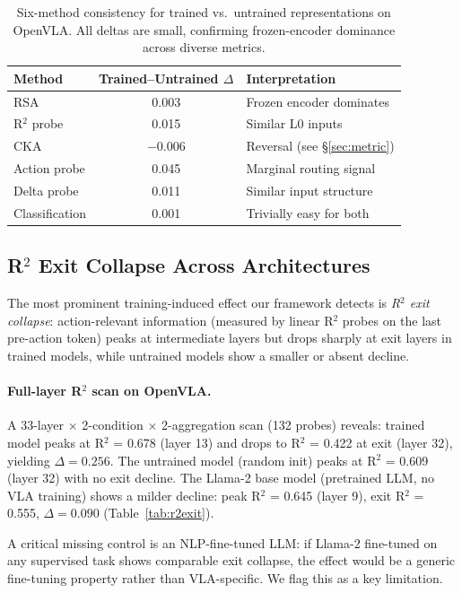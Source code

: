 \documentclass[letterpaper]{article}
\begin{document}
\begin{table}[t]
\centering
\caption{Six-method consistency for trained vs.\ untrained representations on OpenVLA. All deltas are small, confirming frozen-encoder dominance across diverse metrics.}
\label{tab:sixmethod}
\small
\begin{tabular}{lcl}
\toprule
\textbf{Method} & \textbf{Trained--Untrained $\Delta$} & \textbf{Interpretation} \\
\midrule
RSA & 0.003 & Frozen encoder dominates \\
R$^2$ probe & 0.015 & Similar L0 inputs \\
CKA & $-0.006$ & Reversal (see \S\ref{sec:metric}) \\
Action probe & 0.045 & Marginal routing signal \\
Delta probe & 0.011 & Similar input structure \\
Classification & 0.001 & Trivially easy for both \\
\bottomrule
\end{tabular}
\end{table}

\subsection{R$^2$ Exit Collapse Across Architectures}
\label{sec:exit}

The most prominent training-induced effect our framework detects is \emph{R$^2$ exit collapse}: action-relevant information (measured by linear R$^2$ probes on the last pre-action token) peaks at intermediate layers but drops sharply at exit layers in trained models, while untrained models show a smaller or absent decline.

\paragraph{Full-layer R$^2$ scan on OpenVLA.}
A 33-layer $\times$ 2-condition $\times$ 2-aggregation scan (132 probes) reveals: trained model peaks at R$^2$ = 0.678 (layer 13) and drops to R$^2$ = 0.422 at exit (layer 32), yielding $\Delta = 0.256$.
The untrained model (random init) peaks at R$^2$ = 0.609 (layer 32) with no exit decline.
The Llama-2 base model (pretrained LLM, no VLA training) shows a milder decline: peak R$^2$ = 0.645 (layer 9), exit R$^2$ = 0.555, $\Delta = 0.090$ (Table~\ref{tab:r2exit}).

A critical missing control is an NLP-fine-tuned LLM: if Llama-2 fine-tuned on any supervised task shows comparable exit collapse, the effect would be a generic fine-tuning property rather than VLA-specific.
We flag this as a key limitation.
\end{document}
